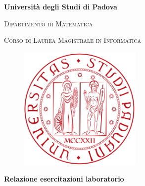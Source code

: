 \documentclass[a4paper, 11pt]{article} %
\begin{document}
\begin{titlepage}
	
	\begin{center}
		
		\begin{LARGE}
			\textbf{Università degli Studi di Padova}\\
		\end{LARGE}
		
		\vspace{10pt}
		
		\begin{Large}
			\textsc{Dipartimento di Matematica}\\
		\end{Large}
		
		\vspace{10pt}
		
		\begin{large}
			\textsc{Corso di Laurea Magistrale in Informatica}\\
		\end{large}
		
		\vspace{30pt}
		\begin{figure}[htbp]
			\begin{center}
				\includegraphics[height=6cm]{immagini/logo-unipd}
			\end{center}
		\end{figure}
		\vspace{10pt} 
		
		\begin{LARGE}
			\begin{center}
				\textbf{Relazione esercitazioni laboratorio}\\
			\end{center}
		\end{LARGE}
		

\end{center}
\end{titlepage}
\end{document}
